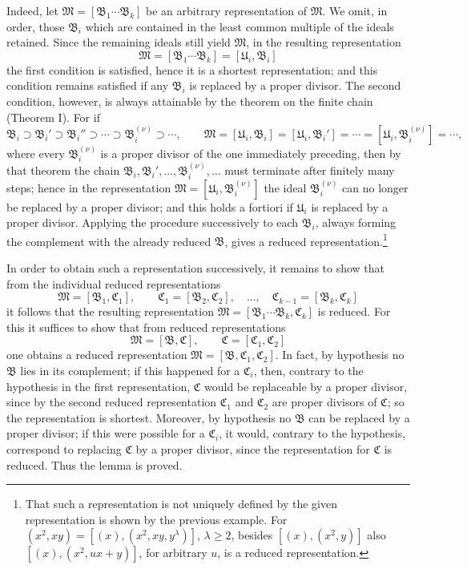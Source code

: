 \documentclass[11pt]{article}
\newcommand{\ideal}[1]{\mathfrak{#1}}
\begin{document}
Indeed, let $\ideal M=[\ideal B_1\cdots\ideal B_k]$ be an arbitrary representation of $\ideal M$. We omit, in order, those $\ideal B_i$ which are contained in the least common multiple of the ideals retained. Since the remaining ideals still yield $\ideal M$, in the resulting representation
\[
 \ideal M=[\ideal B_1\cdots\ideal B_k]=[\ideal U_i,\ideal B_i]
\]
the first condition is satisfied, hence it is a shortest representation; and this condition remains satisfied if any $\ideal B_i$ is replaced by a proper divisor. The second condition, however, is always attainable by the theorem on the finite chain (Theorem I). For if
\[
 \ideal B_i\supset \ideal B_i'\supset \ideal B_i''\supset\cdots\supset \ideal B_i^{(\nu)}\supset\cdots,
 \qquad
 \ideal M=[\ideal U_i,\ideal B_i]=[\ideal U_i,\ideal B_i']=\cdots=[\ideal U_i,\ideal B_i^{(\nu)}]=\cdots,
\]
where every $\ideal B_i^{(\nu)}$ is a proper divisor of the one immediately preceding, then by that theorem the chain $\ideal B_i,\ideal B_i',\ldots,\ideal B_i^{(\nu)},\ldots$ must terminate after finitely many steps; hence in the representation $\ideal M=[\ideal U_i,\ideal B_i^{(\nu)}]$ the ideal $\ideal B_i^{(\nu)}$ can no longer be replaced by a proper divisor; and this holds a fortiori if $\ideal U_i$ is replaced by a proper divisor. Applying the procedure successively to each $\ideal B_i$, always forming the complement with the already reduced $\ideal B$, gives a reduced representation.\footnote{That such a representation is not uniquely defined by the given representation is shown by the previous example. For $(x^2,xy)=[(x),(x^2,xy,y^\lambda)]$, $\lambda\ge2$, besides $[(x),(x^2,y)]$ also $[(x),(x^2,ux+y)]$, for arbitrary $u$, is a reduced representation.}

In order to obtain such a representation successively, it remains to show that from the individual reduced representations
\[
 \ideal M=[\ideal B_1,\ideal C_1],\qquad
 \ideal C_1=[\ideal B_2,\ideal C_2],\quad\ldots,\quad
 \ideal C_{k-1}=[\ideal B_k,\ideal C_k]
\]
it follows that the resulting representation $\ideal M=[\ideal B_1\cdots\ideal B_k,\ideal C_k]$ is reduced. For this it suffices to show that from reduced representations
\[
 \ideal M=[\ideal B,\ideal C],\qquad \ideal C=[\ideal C_1,\ideal C_2]
\]
one obtains a reduced representation $\ideal M=[\ideal B,\ideal C_1,\ideal C_2]$. In fact, by hypothesis no $\ideal B$ lies in its complement; if this happened for a $\ideal C_i$, then, contrary to the hypothesis in the first representation, $\ideal C$ would be replaceable by a proper divisor, since by the second reduced representation $\ideal C_1$ and $\ideal C_2$ are proper divisors of $\ideal C$; so the representation is shortest. Moreover, by hypothesis no $\ideal B$ can be replaced by a proper divisor; if this were possible for a $\ideal C_i$, it would, contrary to the hypothesis, correspond to replacing $\ideal C$ by a proper divisor, since the representation for $\ideal C$ is reduced. Thus the lemma is proved.
\end{document}
